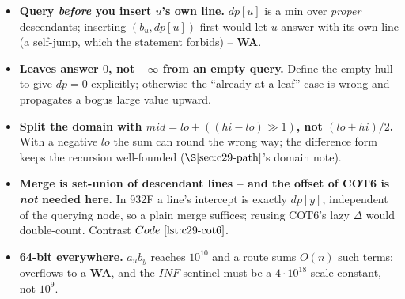 \begin{hardeningbox}
\begin{itemize}[nosep,leftmargin=1.4em]
  \item \textbf{Query \emph{before} you insert \(u\)'s own line.} \(\mathit{dp}[u]\) is a min over
        \emph{proper} descendants; inserting \((b_u,\mathit{dp}[u])\) first would let \(u\) answer with
        its own line (a self-jump, which the statement forbids) -- \textbf{WA}.
  \item \textbf{Leaves answer \(0\), not \(-\infty\) from an empty query.} Define the empty hull to
        give \(\mathit{dp}=0\) explicitly; otherwise the ``already at a leaf'' case is wrong and
        propagates a bogus large value upward.
  \item \textbf{Split the domain with \(\mathit{mid}=\mathit{lo}+((\mathit{hi}-\mathit{lo})\gg1)\), not
        \((\mathit{lo}+\mathit{hi})/2\).} With a negative \(\mathit{lo}\) the sum can round the wrong
        way; the difference form keeps the recursion well-founded (\(\secref{c29-path}\)'s domain note).
  \item \textbf{Merge is set-union of descendant lines -- and the offset of COT6 is \emph{not} needed
        here.} In 932F a line's intercept is exactly \(\mathit{dp}[y]\), independent of the querying
        node, so a plain merge suffices; reusing COT6's lazy \(\Delta\) would double-count. Contrast
        \(\coderef{c29-cot6}\).
  \item \textbf{64-bit everywhere.} \(a_u b_y\) reaches \(10^{10}\) and a route sums \(O(n)\) such
        terms;  overflows to a \textbf{WA}, and the \(\mathit{INF}\) sentinel must be a
        \(4\cdot10^{18}\)-scale constant, not \(10^9\).
\end{itemize}
\end{hardeningbox}


